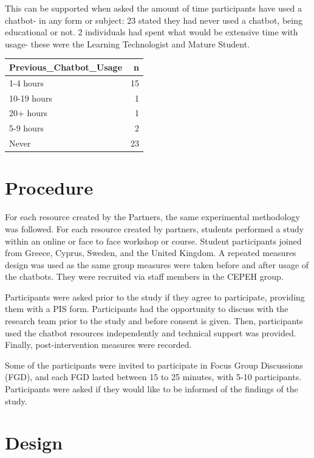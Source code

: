 \documentclass[a4paper, nobind]{templates/ociamthesis}
\begin{document}
This can be supported when asked the amount of time participants have used a chatbot- in any form or subject: 23 stated they had never used a chatbot, being educational or not. 2 individuals had spent what would be extensive time with usage- these were the Learning Technologist and Mature Student.

\begin{longtable}[]{@{}lr@{}}
\toprule()
Previous\_Chatbot\_Usage & n \\
\midrule()
\endhead
1-4 hours & 15 \\
10-19 hours & 1 \\
20+ hours & 1 \\
5-9 hours & 2 \\
Never & 23 \\
\bottomrule()
\end{longtable}

\hypertarget{procedure}{%
\section{Procedure}\label{procedure}}

For each resource created by the Partners, the same experimental methodology was followed. For each resource created by partners, students performed a study within an online or face to face workshop or course. Student participants joined from Greece, Cyprus, Sweden, and the United Kingdom.
A repeated measures design was used as the same group measures were taken before and after usage of the chatbots. They were recruited via staff members in the CEPEH group.

Participants were asked prior to the study if they agree to participate, providing them with a PIS form.
Participants had the opportunity to discuss with the research team prior to the study and before consent is given. Then, participants used the chatbot resources independently and technical support was provided. Finally, post-intervention measures were recorded.

Some of the participants were invited to participate in Focus Group Discussions (FGD), and each FGD lasted between 15 to 25 minutes, with 5-10 participants. Participants were asked if they would like to be informed of the findings of the study.

\hypertarget{design}{%
\section{Design}\label{design}}
\end{document}

